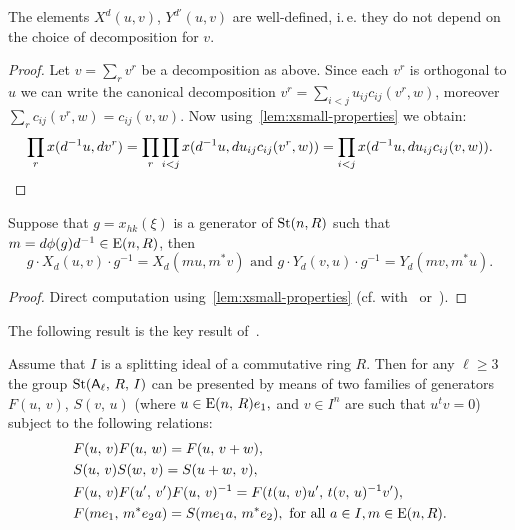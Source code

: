 \begin{lemma}
    \label{lem:xy-wd}
    The elements $X^d(u, v)$, $Y^{d'}(u, v)$ are well-defined, i.\,e. they do not depend on the choice of decomposition for $v$.
\end{lemma}
\begin{proof}
    Let $v = \sum_r v^r$ be a decomposition as above.
    Since each $v^r$ is orthogonal to $u$ we can write the canonical decomposition
    $v^r = \sum_{i<j} u_{ij} c_{ij}(v^r, w)$, moreover $\sum_{r} c_{ij}(v^r, w) = c_{ij}(v, w)$.
    Now using~\cref{lem:xsmall-properties} we obtain:
    \begin{multline*}
        \prod\limits_r x(d^{-1}u, dv^r) = \prod\limits_{r}\prod\limits_{i<j} x(d^{-1} u, du_{ij}c_{ij}(v^r, w)) =
        \prod\limits_{i<j} x(d^{-1} u, d u_{ij}c_{ij}(v, w)). \qedhere
    \end{multline*}
\end{proof}

\begin{lemma}
    \label{lem:xy-conj} Suppose that $g = x_{hk}(\xi)$ is a generator of $\operatorname{St}(n, R)$ such that $m = d\phi(g)d^{-1} \in \operatorname{E}(n, R)$, then
    \begin{equation*}
        g \cdot X_d(u, v) \cdot g^{-1} = X_d(mu, m^*v) \text{ and } g \cdot Y_d(v, u) \cdot g^{-1} = Y_d(mv, m^*u).
    \end{equation*}
\end{lemma}
\begin{proof}
    Direct computation using~\cref{lem:xsmall-properties} (cf. with~\cite[3.14]{Ka77} or~\cite[Lemma~4.4d]{LS17}).
\end{proof}

The following result is the key result of~\cite{LS17}.
\begin{prop}
    \label{prop:rel-presentation}
    Assume that $I$ is a splitting ideal of a commutative ring $R$.
    Then for any $\ell\geq 3$ the group $\operatorname{St}(\mathsf{A}_\ell,\,R,\,I)$ can be presented by means of two families of generators $F(u,\,v)$, $S(v,\,u)$
    (where $u\in \operatorname{E}(n,\,R)e_1,$ and $v\in I^n$ are such that $u^{t}v=0$) subject to the following relations:
    \begin{align}
        &F(u,\,v)F(u,\,w)=F(u,\,v+w), \label{add4}\\
        &S(u,\,v)S(w,\,v)=S(u+w,\,v), \label{add5}\\
        &F(u,\,v)F(u',\,v')F(u,\,v)^{-1}=F(t(u,\,v)u',\,t(v,\,u)^{-1} v'), \label{conj3} \\
        &F(me_1,\,m^{*}e_{2}a)=S(me_{1}a,\,m^{*}e_{2}),\ \text{for all $a\in I$,}\, m \in \operatorname{E}(n, R). \label{coef-move}
    \end{align}
\end{prop}


